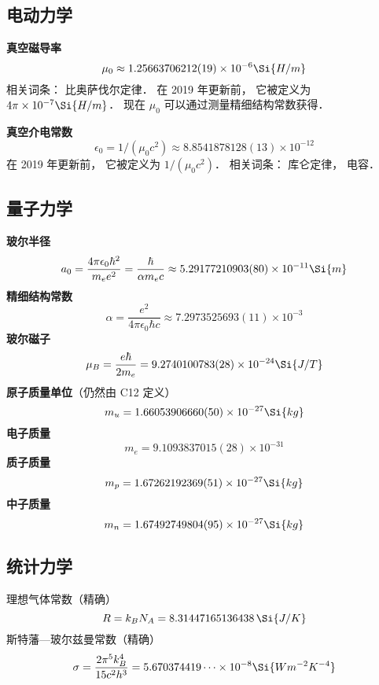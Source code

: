 \subsection{电动力学}

\textbf{真空磁导率}
\begin{equation}
\mu_0 \approx 1.25663706212(19)\times 10^{-6} \Si{H/m}
\end{equation}
相关词条： 比奥萨伐尔定律． 在 2019 年更新前， 它被定义为 $4\pi\times 10^{-7} \Si{H/m}$． 现在 $\mu_0$ 可以通过测量精细结构常数获得．

\textbf{真空介电常数}
\begin{equation}
\epsilon_0 = 1/(\mu_0 c^2) \approx 8.8541878128(13)\times 10^{-12}
\end{equation}
在 2019 年更新前， 它被定义为 $1/(\mu_0 c^2)$． 相关词条： 库仑定律， 电容．

\subsection{量子力学}
\textbf{玻尔半径}
\begin{equation}
a_0 = \frac{4\pi \epsilon_0 \hbar^2}{m_e e^2} = \frac{\hbar}{\alpha m_e c} \approx 5.29177210903(80)\times 10^{-11}\Si{m}
\end{equation}
\textbf{精细结构常数}
\begin{equation}
\alpha = \frac{e^2}{4\pi\epsilon_0\hbar c} \approx 7.2973525693(11)\times 10^{-3}
\end{equation}
\textbf{玻尔磁子}
\begin{equation}
\mu_B = \frac{e\hbar}{2m_e} = 9.2740100783(28)\times 10^{-24} \Si{J/T}
\end{equation}
\textbf{原子质量单位}（仍然由 C12 定义）
\begin{equation}
m_u = 1.66053906660(50)\times 10^{-27} \Si{kg}
\end{equation}
\textbf{电子质量}
\begin{equation}
m_e = 9.1093837015(28)\times 10^{-31}
\end{equation}
\textbf{质子质量}
\begin{equation}
m_p = 1.67262192369(51)\times 10^{-27}\Si{kg}
\end{equation}
\textbf{中子质量}
\begin{equation}
m_n = 1.67492749804(95)\times 10^{-27}\Si{kg}
\end{equation}

\subsection{统计力学}
理想气体常数（精确）
\begin{equation}
R = k_B N_A = 8.31447165136438 \,\Si{J/K}
\end{equation}
斯特藩—玻尔兹曼常数（精确）
\begin{equation}
\sigma = \frac{2\pi^5k_B^4}{15c^2h^3} = 5.670374419\dots \times 10^{-8} \Si{Wm^{-2}K^{-4}}
\end{equation}
